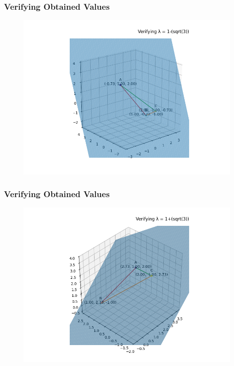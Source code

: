 \documentclass{beamer}
\theoremstyle{remark}
\numberwithin{equation}{section}
\begin{document}
\begin{frame}[fragile]
	\frametitle{Verifying Obtained Values}
	\begin{figure}[h]
		\centering
		\includegraphics[width=0.7\linewidth]{figs/fig2.png}
		\caption{}
		\label{graph2}
	\end{figure}
\end{frame}

\begin{frame}[fragile]
	\frametitle{Verifying Obtained Values}
	\begin{figure}[h]
		\centering
		\includegraphics[width=0.7\linewidth]{figs/fig3.png}
		\caption{}
		\label{graph3}
	\end{figure}
\end{frame}
\end{document}
